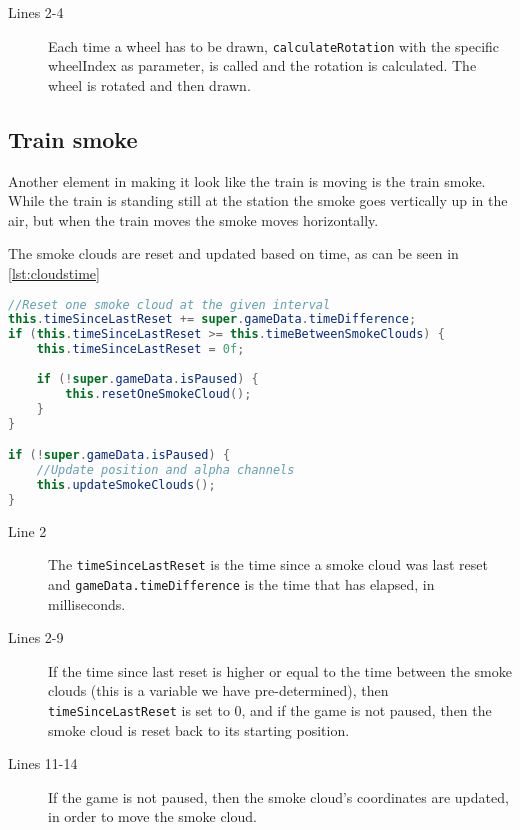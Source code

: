 \begin{description}
\item[Lines 2-4] Each time a wheel has to be drawn, \lstinline|calculateRotation| with the specific wheelIndex as parameter, is called and the rotation is calculated. The wheel is rotated and then drawn. 
\end{description}

\subsection{Train smoke}

Another element in making it look like the train is moving is the train smoke. While the train is standing still at the station the smoke goes vertically up in the air, but when the train moves the smoke moves horizontally. 

The smoke clouds are reset and updated based on time, as can be seen in \autoref{lst:cloudstime}

\begin{lstlisting}[language=java,firstnumber=1,caption={Smoke clouds getting reset based on time intervals.},label=lst:cloudstime]
//Reset one smoke cloud at the given interval
this.timeSinceLastReset += super.gameData.timeDifference;
if (this.timeSinceLastReset >= this.timeBetweenSmokeClouds) {
    this.timeSinceLastReset = 0f;
    
    if (!super.gameData.isPaused) {
        this.resetOneSmokeCloud();
    }
}

if (!super.gameData.isPaused) {
    //Update position and alpha channels
    this.updateSmokeClouds();
}
\end{lstlisting}

\begin{description}
\item[Line 2] The \lstinline|timeSinceLastReset| is the time since a smoke cloud was last reset and \lstinline|gameData.timeDifference| is the time that has elapsed, in milliseconds. 
\item[Lines 2-9] If the time since last reset is higher or equal to the time between the smoke clouds (this is a variable we have pre-determined), then \lstinline|timeSinceLastReset| is set to 0, and if the game is not paused, then the smoke cloud is reset back to its starting position. 
\item[Lines 11-14] If the game is not paused, then the smoke cloud's coordinates are updated, in order to move the smoke cloud. 
\end{description}

